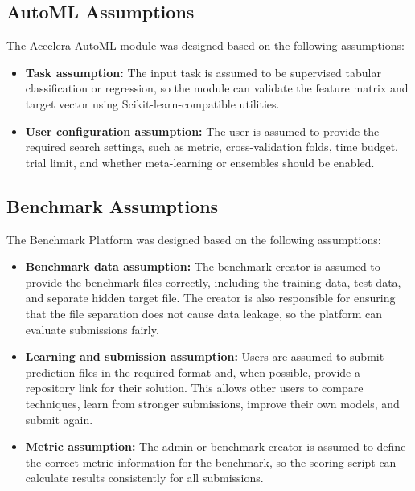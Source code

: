 \documentclass[12pt,a4paper]{report}
\begin{document}
\subsection{AutoML Assumptions}

The Accelera AutoML module was designed based on the following
assumptions:

\begin{itemize}
  \item \textbf{Task assumption:} The input task is assumed to be supervised
  tabular classification or regression, so the module can validate the feature
  matrix and target vector using Scikit-learn-compatible utilities.

  \item \textbf{User configuration assumption:} The user is assumed to provide
  the required search settings, such as metric, cross-validation folds,
  time budget, trial limit, and whether meta-learning or ensembles should be
  enabled.
  
\end{itemize}
\subsection{Benchmark Assumptions}

The Benchmark Platform was designed based on the following assumptions:

\begin{itemize}
  \item \textbf{Benchmark data assumption:} The benchmark creator is assumed to
  provide the benchmark files correctly, including the training data, test data,
  and separate hidden target file. The creator is also responsible for ensuring
  that the file separation does not cause data leakage, so the platform can
  evaluate submissions fairly.

  \item \textbf{Learning and submission assumption:} Users are assumed to submit
  prediction files in the required format and, when possible, provide a
  repository link for their solution. This allows other users to compare
  techniques, learn from stronger submissions, improve their own models, and
  submit again.

  \item \textbf{Metric assumption:} The admin or benchmark creator is assumed to
  define the correct metric information for the benchmark, so the scoring script
  can calculate results consistently for all submissions.
\end{itemize}
\end{document}
